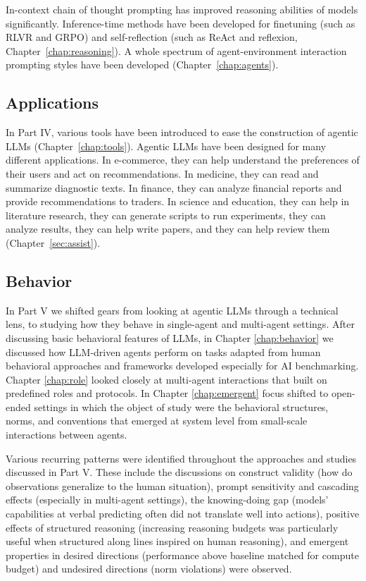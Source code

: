 In-context chain of thought prompting has improved reasoning abilities of models significantly. Inference-time methods have been developed for finetuning (such as RLVR and GRPO) and self-reflection (such as ReAct and reflexion, Chapter~\ref{chap:reasoning}). A whole spectrum of agent-environment interaction prompting styles have been developed (Chapter~\ref{chap:agents}).

\subsection{Applications}
In Part IV, various tools have been introduced to ease the construction of agentic LLMs (Chapter~\ref{chap:tools}). Agentic LLMs have been designed for many different applications. In e-commerce, they can help understand the preferences of their users and act on recommendations. In  medicine, they can read and summarize diagnostic texts. In finance, they can analyze financial reports and provide recommendations to traders. In science and education, they can help in literature research, they can generate scripts to run experiments, they can analyze results, they can help write papers, and they can help review them (Chapter~\ref{sec:assist}). 

\subsection{Behavior}
In Part V we shifted gears from looking at agentic LLMs through a technical lens, to studying how they behave in single-agent and multi-agent settings. After discussing basic behavioral features of LLMs, in Chapter \ref{chap:behavior} we discussed how LLM-driven agents perform on tasks adapted from human behavioral approaches and frameworks developed especially for AI benchmarking. Chapter \ref{chap:role} looked closely at multi-agent interactions that built on predefined roles and protocols. In Chapter \ref{chap:emergent} focus shifted to open-ended settings in which the object of study were the behavioral structures, norms, and conventions that emerged at system level from small-scale interactions between agents.

Various recurring patterns were identified throughout the approaches and studies discussed in Part V. These include the discussions on construct validity (how do observations generalize to the human situation), prompt sensitivity and cascading effects (especially in multi-agent settings), the knowing-doing gap (models' capabilities at verbal predicting often did not translate well into actions), positive effects of structured reasoning (increasing reasoning budgets was particularly useful when structured along lines inspired on human reasoning), and emergent properties in desired directions (performance above baseline matched for compute budget) and undesired directions (norm violations) were observed.

